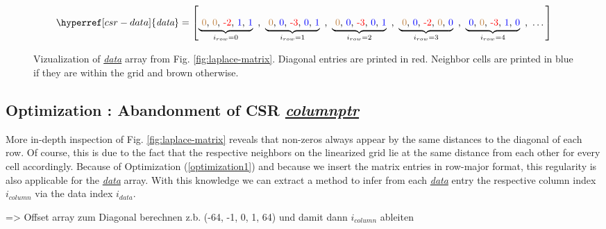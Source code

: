 \newpage
\begin{figure*}
\centering
\[
	\hyperref[csr-data]{\textit{data}} = \left[ 
	\underbrace{\text{ \textcolor{brown}{0}, \textcolor{brown}{0}, \textcolor{red}{-2}, \textcolor{blue}{1}, \textcolor{blue}{1}}}_{i_{row} = 0} \text{ , }
	\underbrace{\text{ \textcolor{brown}{0}, \textcolor{blue}{0}, \textcolor{red}{-3}, \textcolor{blue}{0}, \textcolor{blue}{1}}}_{i_{row} = 1} \text{ , }
	\underbrace{\text{ \textcolor{brown}{0}, \textcolor{blue}{0}, \textcolor{red}{-3}, \textcolor{blue}{0}, \textcolor{blue}{1}}}_{i_{row} = 2} \text{ , }
	\underbrace{\text{ \textcolor{brown}{0}, \textcolor{blue}{0}, \textcolor{red}{-2}, \textcolor{brown}{0}, \textcolor{blue}{0}}}_{i_{row} = 3} \text{ , }
	\underbrace{\text{ \textcolor{blue}{0}, \textcolor{brown}{0}, \textcolor{red}{-3}, \textcolor{blue}{1}, \textcolor{blue}{0}}}_{i_{row} = 4} \text{ , }
	\dots
	\right]
\]
\caption{Vizualization of \hyperref[csr-data]{\textit{data}} array from Fig. \ref{fig:laplace-matrix}. Diagonal entries are printed in red. Neighbor cells are printed in blue if they are within the grid and brown otherwise.
}
\label{fig:data-columnptr-merge}
\end{figure*} 

\subsection{Optimization : Abandonment of CSR \hyperref[csr-columnptr]{\textit{columnptr}}}
More in-depth inspection of Fig. \ref{fig:laplace-matrix} reveals that non-zeros always appear by the same distances to the diagonal of each row. Of course, this is due to the fact that the respective neighbors on the linearized grid lie at the same distance from each other for every cell accordingly. Because of Optimization  (\ref{optimization1}) and because we insert the matrix entries in row-major format, this regularity is also applicable for the \hyperref[csr-data]{\textit{data}} array. With this knowledge we can extract a method to infer from each \hyperref[csr-data]{\textit{data}} entry the respective column index $i_{column}$ via the data index $i_{data}$. 
\par 



\par [\dots]
\par => Offset array zum Diagonal berechnen z.b. (-64, -1, 0, 1, 64) und damit dann $i_{column}$ ableiten

\newpage

